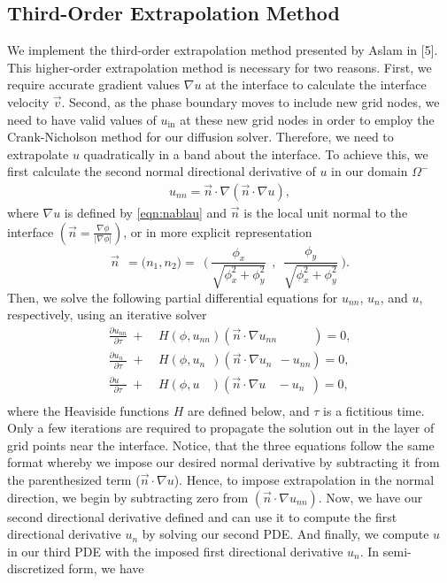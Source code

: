 \documentclass[oneside,12pt,final]{/Applications/TeX/packages/ucthesis-CA2012}
\begin{document}
\begin{mainmatter}
\section{Third-Order Extrapolation Method}

We implement the third-order extrapolation method presented by Aslam in [5]. This higher-order extrapolation method is necessary for two reasons. First, we require accurate gradient values $\nabla u$ at the interface to calculate the interface velocity $\vec{v}$. Second, as the phase boundary moves to include new grid nodes, we need to have valid values of $u_{\text{in}}$ at these new grid nodes in order to employ the Crank-Nicholson method for our diffusion solver. Therefore, we need to extrapolate $u$ quadratically in a band about the interface. To achieve this, we first calculate the second normal directional derivative of $u$ in our domain $\Omega^-$
\begin{equation}  
\begin{aligned}
u_{nn} = \vec{n} \cdot \nabla(\vec{n} \cdot \nabla u),
\end{aligned}
\end{equation}
where $\nabla u$ is defined by \eqref{eqn:nablau} and $\vec{n}$ is the local unit normal to the interface $(\vec{n} = \frac{\nabla \phi}{|\nabla \phi|})$, or in more explicit representation
\begin{equation}\label{eqn:normal}
\vec{n}\>\> = \bigg( n_1,n_2 \bigg) = \>\>\bigg( \> \frac{\phi_x}{\sqrt{\phi_x^2 + \phi_y^2}}\>\>,\>\> \frac{\phi_y}{\sqrt{\phi_x^2 + \phi_y^2}} \> \bigg).
\end{equation}
Then, we solve the following partial differential equations for $u_{nn}$, $u_n$, and $u$, respectively, using an iterative solver
\begin{equation}  
\begin{aligned}
\frac{\partial u_{nn}}{\partial \tau} \> + \> &H(\phi,u_{nn})(\vec{n} \cdot \nabla u_{nn}\>\>\>\>\>\>\>\>\>\>\>\>\>) = 0,\\
\frac{\partial u_{n}\>\>}{\partial \tau} \> + \>&H(\phi,u_{n }\>\>)(\vec{n} \cdot \nabla u_{n}\>\>-u_{nn}) = 0,\\
\frac{\partial u\>\>\>\>}{\partial \tau} \> + \> &H(\phi,u\>\>\>\>)(\vec{n} \cdot \nabla u\>\>\>\> - u_n\>\>) = 0,\\
\end{aligned}
\end{equation}
where the Heaviside functions $H$ are defined below, and $\tau$ is a fictitious time. Only a few iterations are required to propagate the solution out in the layer of grid points near the interface. Notice, that the three equations follow the same format whereby we impose our desired normal derivative by subtracting it from the parenthesized term ($\vec{n} \cdot \nabla u$). Hence, to impose extrapolation in the normal direction, we begin by subtracting zero from $(\vec{n} \cdot \nabla u_{nn})$. Now, we have our second directional derivative defined and can use it to compute the first directional derivative $u_{n}$ by solving our second PDE. And finally, we compute $u$ in our third PDE with the imposed first directional derivative $u_n$. In semi-discretized form, we have

\end{mainmatter}
\end{document}
